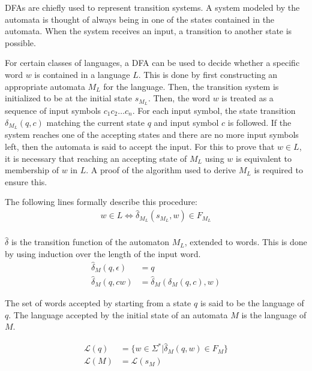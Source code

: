 DFAs are chiefly used to represent transition systems.
A system modeled by the automata is thought of always being in one of the states contained in the automata.
When the system receives an input, a transition to another state is possible.

For certain classes of languages, a DFA can be used to decide whether a specific word $w$ is contained in a language $L$.
This is done by first constructing an appropriate automata $M_L$ for the language.
Then, the transition system is initialized to be at the initial state $s_{M_L}$.
Then, the word $w$ is treated as a sequence of input symbols $c_1 c_2 \ldots c_n$.
For each input symbol, the state transition $\delta_{M_L}(q, c)$ matching the current state $q$ and input symbol $c$ is followed.
If the system reaches one of the accepting states and there are no more input symbols left, then the
automata is said to accept the input.
For this to prove that $w \in L$, it is necessary that reaching an accepting state of $M_L$ using $w$ is equivalent to membership of $w$ in $L$.
A proof of the algorithm used to derive $M_L$ is required to ensure this.

The following lines formally describe this procedure:
\begin{align}
    w \in L \Leftrightarrow \hat\delta_{M_L}(s_{M_L}, w) \in F_{M_L} \\
\end{align}

\begin{definition}
    $\hat\delta$ is the transition function of the automaton $M_L$, extended to words.
    This is done by using induction over the length of the input word.
    \begin{align}
        \hat\delta_M(q, \epsilon) &= q\\
        \hat\delta_M(q, c w) &= \hat\delta_M(\delta_M(q, c), w)
    \end{align}
\end{definition}

\begin{definition}
    The set of words accepted by starting from a state $q$ is said to be the language of $q$.
    The language accepted by the initial state of an automata $M$ is the language of $M$.

    \begin{align}
        \mathcal{L}(q) &= \{ w \in \Sigma^\ast | \hat\delta_M(q, w) \in F_M \}\\
        \mathcal{L}(M) &= \mathcal{L}(s_M)
    \end{align}
\end{definition}


